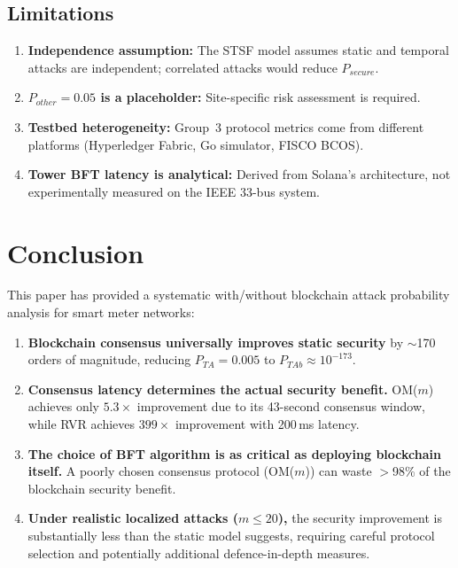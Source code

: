 \documentclass[10pt,twocolumn,letterpaper]{article}
\begin{document}
\subsection{Limitations}

\begin{enumerate}[leftmargin=*]
    \item \textbf{Independence assumption:} The STSF model assumes static and temporal attacks are independent; correlated attacks would reduce $P_{secure}$.
    \item \textbf{$P_{other} = 0.05$ is a placeholder:} Site-specific risk assessment is required.
    \item \textbf{Testbed heterogeneity:} Group~3 protocol metrics come from different platforms (Hyperledger Fabric, Go simulator, FISCO BCOS).
    \item \textbf{Tower BFT latency is analytical:} Derived from Solana's architecture, not experimentally measured on the IEEE 33-bus system.
\end{enumerate}

\section{Conclusion}
\label{sec:conclusion}

This paper has provided a systematic with/without blockchain attack probability analysis for smart meter networks:

\begin{enumerate}[leftmargin=*]
    \item \textbf{Blockchain consensus universally improves static security} by $\sim$170 orders of magnitude, reducing $P_{TA} = 0.005$ to $P_{TAb} \approx 10^{-173}$.

    \item \textbf{Consensus latency determines the actual security benefit.} OM($m$) achieves only $5.3\times$ improvement due to its 43-second consensus window, while RVR achieves $399\times$ improvement with 200\,ms latency.

    \item \textbf{The choice of BFT algorithm is as critical as deploying blockchain itself.} A poorly chosen consensus protocol (OM($m$)) can waste $>$98\% of the blockchain security benefit.

    \item \textbf{Under realistic localized attacks ($m \leq 20$),} the security improvement is substantially less than the static model suggests, requiring careful protocol selection and potentially additional defence-in-depth measures.
\end{enumerate}
\end{document}
